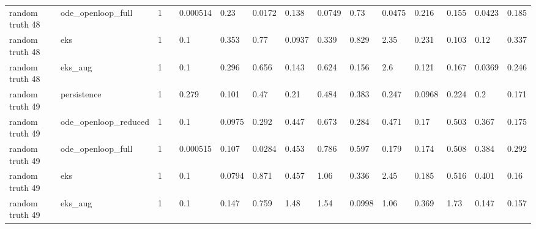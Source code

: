 \begin{table}[t]
\begin{tabular}{lllllllllllllll}
random truth 48 & ode\_openloop\_full & 1 &  & 0.000514 & 0.23 & 0.0172 & 0.138 & 0.0749 & 0.73 & 0.0475 & 0.216 & 0.155 & 0.0423 & 0.185 \\
random truth 48 & eks & 1 &  & 0.1 & 0.353 & 0.77 & 0.0937 & 0.339 & 0.829 & 2.35 & 0.231 & 0.103 & 0.12 & 0.337 \\
random truth 48 & eks\_aug & 1 &  & 0.1 & 0.296 & 0.656 & 0.143 & 0.624 & 0.156 & 2.6 & 0.121 & 0.167 & 0.0369 & 0.246 \\
random truth 49 & persistence & 1 &  & 0.279 & 0.101 & 0.47 & 0.21 & 0.484 & 0.383 & 0.247 & 0.0968 & 0.224 & 0.2 & 0.171 \\
random truth 49 & ode\_openloop\_reduced & 1 &  & 0.1 & 0.0975 & 0.292 & 0.447 & 0.673 & 0.284 & 0.471 & 0.17 & 0.503 & 0.367 & 0.175 \\
random truth 49 & ode\_openloop\_full & 1 &  & 0.000515 & 0.107 & 0.0284 & 0.453 & 0.786 & 0.597 & 0.179 & 0.174 & 0.508 & 0.384 & 0.292 \\
random truth 49 & eks & 1 &  & 0.1 & 0.0794 & 0.871 & 0.457 & 1.06 & 0.336 & 2.45 & 0.185 & 0.516 & 0.401 & 0.16 \\
random truth 49 & eks\_aug & 1 &  & 0.1 & 0.147 & 0.759 & 1.48 & 1.54 & 0.0998 & 1.06 & 0.369 & 1.73 & 0.147 & 0.157 \\
\bottomrule
\end{tabular}
\end{table}
